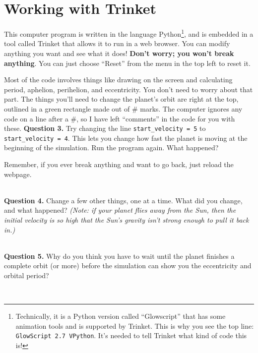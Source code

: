 \documentclass[11pt]{article}
\begin{document}
\section{Working with Trinket}

This computer program is written in the language Python\footnote{Technically, it is a Python version called ``Glowscript'' that has some animation tools and is supported
	by Trinket. This is why you see the top line: {\tt GlowScript 2.7 VPython}. It's needed to tell Trinket what kind of code this is!}, and is embedded in a tool called Trinket that allows it to run in a web browser. You can modify anything you want and see what it does! {\bf Don't worry; you won't break anything}. You can just choose ``Reset'' from the menu in the top left to reset it.

Most of the code involves things like drawing on the screen and calculating period, aphelion, perihelion, and eccentricity. You don't need to worry about that part. The things you'll need to change the planet's orbit are right at the top, outlined in a green rectangle made out of \# marks. The computer ignores any code on a line after a \#, so I have left ``comments'' in the code for you with these.
\newpage
\textbf{Question 3.} Try changing the line {\tt start\_velocity   = 5} to {\tt start\_velocity   = 4}. This lets you change how fast the planet is moving at the beginning of the simulation. Run the program again. What happened?

Remember, if you ever break anything and want to go back, just reload the webpage.

\vspace*{1.5cm}
\hrulefill\\

\textbf{Question 4.} Change a few other things, one at a time. What did you change, and what happened? {\it (Note: if your planet flies away from the Sun, then the initial velocity is so high that the Sun's gravity isn't strong enough to pull it back in.)}

\vspace*{4cm}
\hrulefill\\

\textbf{Question 5.} Why do you think you have to wait until the planet finishes a complete orbit (or more) before the simulation can show you the eccentricity and orbital period?

\vspace*{2.5cm}
\hrulefill\\
\end{document}
